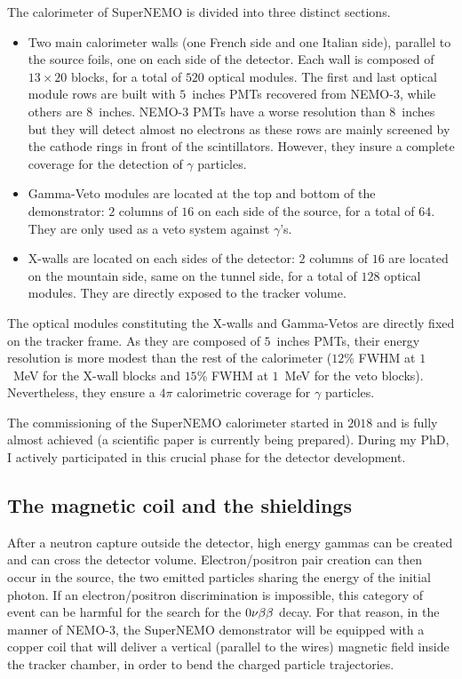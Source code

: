 The calorimeter of SuperNEMO is divided into three distinct sections.
\begin{itemize}
\item Two main calorimeter walls (one French side and one Italian side), parallel to the source foils, one on each side of the detector.
  Each wall is composed of $13\times20$ blocks, for a total of $520$ optical modules.
  The first and last optical module rows are built with $5$~inches PMTs recovered from NEMO-$3$, while others are $8$~inches.
  NEMO-$3$ PMTs have a worse resolution than $8$~inches but they will detect almost no electrons as these rows are mainly screened by the cathode rings in front of the scintillators.
  However, they insure a complete coverage for the detection of $\gamma$ particles.
\item Gamma-Veto modules are located at the top and bottom of the demonstrator: $2$ columns of $16$ on each side of the source, for a total of $64$.
  They are only used as a veto system against $\gamma$'s.
\item X-walls are located on each sides of the detector: $2$ columns of $16$ are located on the mountain side, same on the tunnel side, for a total of $128$ optical modules.
  They are directly exposed to the tracker volume.
\end{itemize}
The optical modules constituting the X-walls and Gamma-Vetos are directly fixed on the tracker frame.
As they are composed of $5$~inches PMTs, their energy resolution is more modest than the rest of the calorimeter ($12$\% FWHM at $1$~MeV for the X-wall blocks and $15$\% FWHM at $1$~MeV for the veto blocks).
Nevertheless, they ensure a $4\pi$ calorimetric coverage for $\gamma$ particles.

The commissioning of the SuperNEMO calorimeter started in $2018$ and is fully almost achieved (a scientific paper is currently being prepared).
During my PhD, I actively participated in this crucial phase for the detector development.


\subsection{The magnetic coil and the shieldings}
\label{subsec:magnetic_field}

After a neutron capture outside the detector, high energy gammas can be created and can cross the detector volume.
Electron/positron pair creation can then occur in the source, the two emitted particles sharing the energy of the initial photon.
If an electron/positron discrimination is impossible, this category of event can be harmful for the search for the $0\nu\beta\beta$ decay.
For that reason, in the manner of NEMO-$3$, the SuperNEMO demonstrator will be equipped with a copper coil that will deliver a vertical (parallel to the wires) magnetic field inside the tracker chamber, in order to bend the charged particle trajectories.

